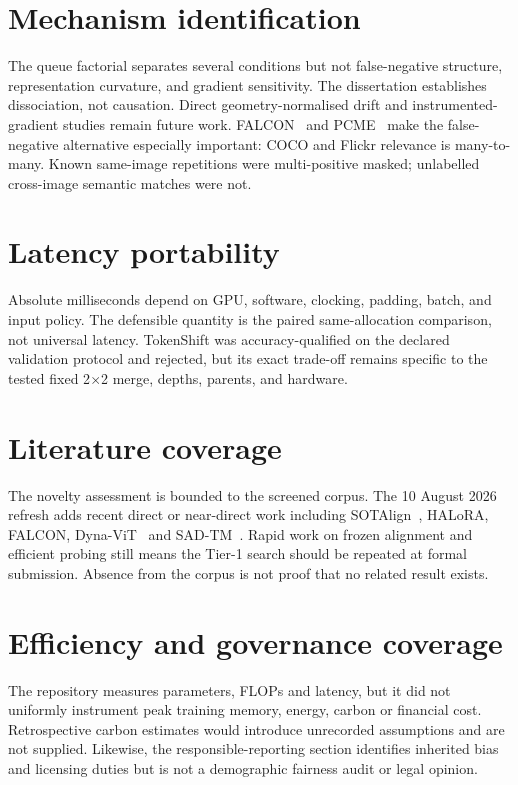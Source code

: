 \documentclass[11pt,a4paper,oneside]{report}
\begin{document}
\section{Mechanism identification}
The queue factorial separates several conditions but not false-negative structure, representation curvature, and gradient sensitivity. The dissertation establishes dissociation, not causation. Direct geometry-normalised drift and instrumented-gradient studies remain future work. FALCON~\cite{kim2026falcon} and PCME~\cite{chun2021pcme} make the false-negative alternative especially important: COCO and Flickr relevance is many-to-many. Known same-image repetitions were multi-positive masked; unlabelled cross-image semantic matches were not.

\section{Latency portability}
Absolute milliseconds depend on GPU, software, clocking, padding, batch, and input policy. The defensible quantity is the paired same-allocation comparison, not universal latency. TokenShift was accuracy-qualified on the declared validation protocol and rejected, but its exact trade-off remains specific to the tested fixed 2$\times$2 merge, depths, parents, and hardware.

\section{Literature coverage}
The novelty assessment is bounded to the screened corpus. The 10 August 2026 refresh adds recent direct or near-direct work including SOTAlign~\cite{roschmann2026sotalign}, HALoRA, FALCON, Dyna-ViT~\cite{rubab2026dynavit} and SAD-TM~\cite{xie2026sadtm}. Rapid work on frozen alignment and efficient probing still means the Tier-1 search should be repeated at formal submission. Absence from the corpus is not proof that no related result exists.

\section{Efficiency and governance coverage}
The repository measures parameters, FLOPs and latency, but it did not uniformly instrument peak training memory, energy, carbon or financial cost. Retrospective carbon estimates would introduce unrecorded assumptions and are not supplied. Likewise, the responsible-reporting section identifies inherited bias and licensing duties but is not a demographic fairness audit or legal opinion.
\end{document}
